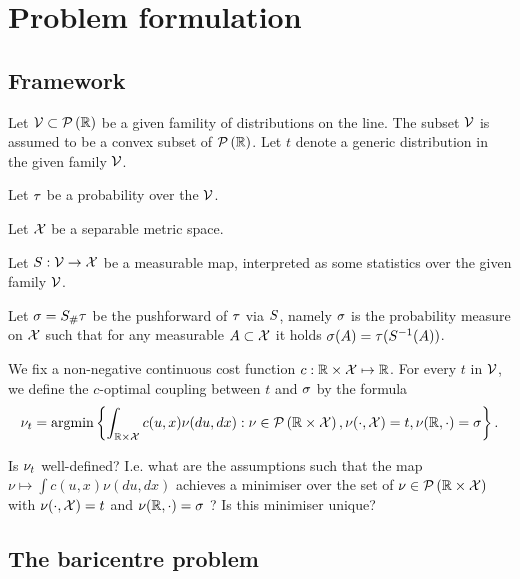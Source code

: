 \section{Problem formulation}

\subsection{Framework}

Let
$\givenFamily \subset \probabilitiesOver{\R}$ 
be a given famility of distributions on the line. 
The subset $\givenFamily$ is assumed to be a 
convex subset of $\probabilitiesOver{\R}$.
Let
$t$ 
denote a generic distribution in the given family $\givenFamily$.

Let
$\familiyDistribution$ 
be a probability over the $\givenFamily$. 

Let
$\statisticsSpace$ 
be a separable metric space.

Let
$\statistics: \givenFamily \rightarrow \statisticsSpace$ 
be a measurable map, 
interpreted as some statistics over the given family $\givenFamily$.

Let 
$\pushforwardStat = \statistics_{\#} \familiyDistribution$
be the pushforward of $\familiyDistribution$ via $\statistics$,
namely 
$\pushforwardStat$ is the probability measure on $\statisticsSpace$
such that for any measurable $A \subset \statisticsSpace$ 
it holds
$\pushforwardStat(A) = \familiyDistribution (\statistics\inverse(A))$.


We fix a non-negative continuous cost function
$c:\R \times \statisticsSpace \mapsto \R$.
For every $t$ in $\givenFamily$,
we define the $c$-optimal coupling between 
$t$ and $\pushforwardStat$ by the formula
\begin{equation}
\label{eq.definition_of_t_coupling}
\coupling[t] = 
\argmin 
\left\lbrace
	\int_{\R \times \statisticsSpace}
	c(u, x)\nu(du, dx):
\nu \in \probabilitiesOver{\R\times \statisticsSpace},
\nu(\cdot, \statisticsSpace) = t,
\nu(\R, \cdot) = \pushforwardStat
\right\rbrace.
\end{equation}

Is $\coupling[t]$ well-defined? 
I.e. what are the assumptions such that the map 
$
\nu\mapsto \int c(u, x) \nu(du, dx)
$
achieves a minimiser over the set of 
$
\nu \in \probabilitiesOver{\R\times \statisticsSpace}
$
with
$
\nu(\cdot, \statisticsSpace) = t
$
and 
$
\nu(\R, \cdot) = \pushforwardStat
$
?
Is this minimiser unique?


\subsection{The baricentre problem}

